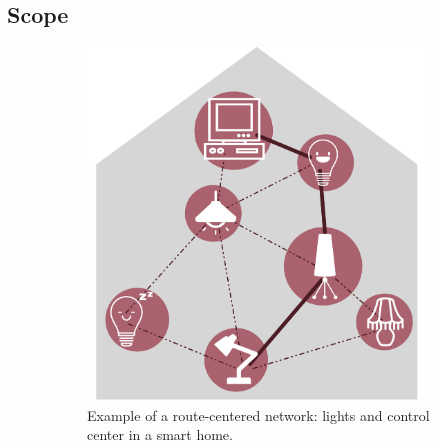 \documentclass[a4paper,10pt]{scrartcl}
\begin{document}
\subsection{Scope}
\label{subsec:scope}

\begin{figure}
        \centering
        \begin{subfigure}[b]{0.5\textwidth}
                \includegraphics[width=\textwidth]{../images/route_centered_example}
                \caption{Example of a route-centered network: lights and control center in a smart home.}
                \label{fig:rc_img}
        \end{subfigure}%
        ~ %
        \begin{subfigure}[b]{0.5\textwidth}

\end{subfigure}
\end{figure}
\end{document}
